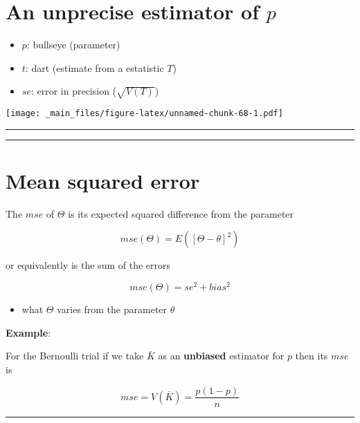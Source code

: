 \documentclass[
]{book}
\providecommand{\tightlist}{%
  \setlength{\itemsep}{0pt}\setlength{\parskip}{0pt}}
\begin{document}
\hypertarget{an-unprecise-estimator-of-p}{%
\section{\texorpdfstring{An unprecise estimator of \(p\)}{An unprecise estimator of p}}\label{an-unprecise-estimator-of-p}}

\begin{itemize}
\tightlist
\item
  \(p\): bullseye (parameter)
\item
  \(t\): dart (estimate from a estatistic \(T\))
\item
  \(se\): error in precision (\(\sqrt{V(T)}\))
\end{itemize}

\texttt{[image: \_main\_files/figure-latex/unnamed-chunk-68-1.pdf]}

\begin{center}\rule{0.5\linewidth}{0.5pt}\end{center}

\begin{center}\rule{0.5\linewidth}{0.5pt}\end{center}

\hypertarget{mean-squared-error}{%
\section{Mean squared error}\label{mean-squared-error}}

The \(mse\) of \(\Theta\) is its expected squared difference from the parameter

\[mse(\Theta)=E([\Theta - \theta]^2)\]

or equivalently is the sum of the errors

\[mse(\Theta)=se^2 + bias^2\]

\begin{itemize}
\tightlist
\item
  what \(\Theta\) varies from the parameter \(\theta\)
\end{itemize}

\textbf{Example}:

For the Bernoulli trial if we take \(\bar{K}\) as an \textbf{unbiased} estimator for \(p\) then its \(mse\) is

\[mse=V(\bar{K})=\frac{p(1-p)}{n}\]

\begin{center}\rule{0.5\linewidth}{0.5pt}\end{center}
\end{document}
